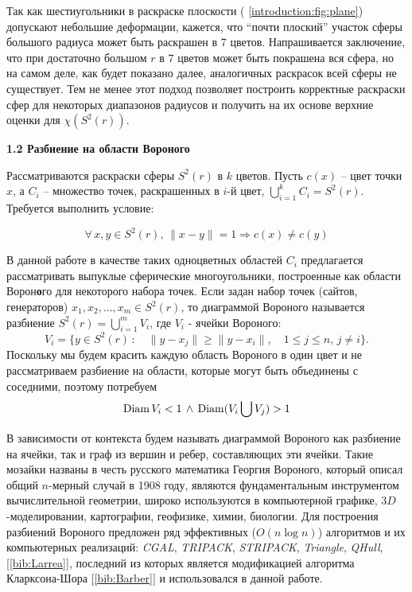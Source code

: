 Так как шестиугольники в раскраске плоскости (\figurename{ \ref{introduction:fig:plane}}) допускают небольшие деформации, кажется, что \enquote{почти плоский} участок сферы большого радиуса может быть раскрашен в $7$ цветов. Напрашивается заключение, что при достаточно большом $r$ в $7$ цветов может быть покрашена вся сфера, но на самом деле, как будет показано далее, аналогичных раскрасок всей сферы не существует. Тем не менее этот подход позволяет построить корректные 
раскраски сфер для некоторых диапазонов радиусов и получить на их основе верхние оценки для $\chi(S^2(r))$.

\vspace{5pt}
\textbf{1.2 Разбиение на области Вороного}\label{chapters:1.2}
\vspace{5pt}

Рассматриваются раскраски сферы $S^2(r)$ в $k$ цветов. 
Пусть $c(x)$ -- цвет точки $x$, а $C_i$ -- множество точек, раскрашенных в $i$-й цвет, $\bigcup\limits_{i=1}^{k} C_i = S^2(r)$. 
Требуется выполнить условие:

\begin{equation}\label{chapter1:propercoloring}
\forall \, x,y \in S^2(r), \, \|x - y\|=1 \Rightarrow c(x) \ne c(y)
\end{equation}

В данной работе в качестве таких одноцветных областей $C_i$ предлагается 
рассматривать выпуклые сферические многоугольники, построенные как области Ворон\textbf{о}го для некоторого набора точек.
Если задан набор точек (сайтов, генераторов) $x_1, x_2, \dots , x_m \in S^2(r)$, то диаграммой Вороного называется разбиение
$S^2(r)= \bigcup\limits_{i=1}^m V_i$, где $V_i$ - ячейки Вороного:
$$V_i = \{y \in S^2(r) \, : \quad \|y - x_j\| \geq \|y - x_i\|, \quad 1 \leq j \leq n, \, j \neq i \}.$$
Поскольку мы будем красить каждую область Вороного в один цвет и не 
рассматриваем разбиение на области, которые могут быть объединены с соседними, поэтому потребуем
\begin{equation}\label{chapter1:eq:diams}
\operatorname{Diam} V_i < 1 \, \land \, \operatorname{Diam} (V_i \bigcup V_j) > 1
\end{equation}

В зависимости от контекста будем называть диаграммой Вороного как разбиение на ячейки, так и граф из вершин и ребер, составляющих эти ячейки. Такие мозайки названы в честь русского математика Георгия Вороного, который описал общий $n$-мерный случай в 1908 году,
являются фундаментальным инструментом вычислительной геометрии, широко используются в компьютерной графике, $3D$-моделировании, картографии, геофизике, химии, биологии. 
Для построения разбиений Вороного предложен ряд эффективных ($O(n\log{}n)$) алгоритмов и их компьютерных реализаций: 
\textit{CGAL}, \textit{TRIPACK}, \textit{STRIPACK}, \textit{Triangle}, \textit{QHull}, 
[\ref{bib:Larrea}], последний из которых является модификацией алгоритма Кларксона-Шора [\ref{bib:Barber}] и использовался в данной работе.

